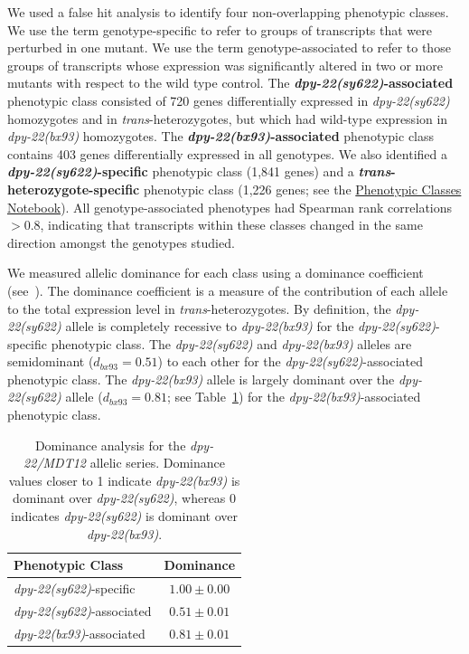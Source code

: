 \documentclass[8pt, twocolumn]{article}
\newcommand{\gene}[1]{\mbox{\emph{#1}}}
\newcommand{\dpy}[1]{\gene{dpy-22#1}}
\newcommand{\bx}{\dpy{(bx93)}}
\newcommand{\sy}{\dpy{(sy622)}}
\begin{document}
We used a false hit analysis to identify four non-overlapping phenotypic
classes. We use the term genotype-specific to refer to groups of transcripts
that were perturbed in one mutant. We use the term genotype-associated to refer
to those groups of transcripts whose expression was significantly altered in two
or more mutants with respect to the wild type control. The
\textbf{\sy{}-associated} phenotypic class consisted of 720 genes differentially
expressed in \sy{} homozygotes and in \emph{trans}-heterozygotes, but which had
wild-type expression in \bx{} homozygotes. The \textbf{\bx{}-associated}
phenotypic class contains 403 genes differentially expressed in all genotypes.
We also identified a \textbf{\sy{}-specific} phenotypic class (1,841 genes) and
a \textbf{\emph{trans}-heterozygote-specific} phenotypic class (1,226 genes; see
the
\href{https://wormlabcaltech.github.io/med-cafe/notebook/phenotypic_classes.html}{
Phenotypic Classes Notebook}). All genotype-associated phenotypes had Spearman
rank correlations $>0.8$, indicating that transcripts within these classes
changed in the same direction amongst the genotypes studied.

We measured allelic dominance for each class using a dominance coefficient
(see~). The dominance coefficient is a measure of the
contribution of each allele to the total expression level in
\emph{trans}-heterozygotes. By definition, the \sy{} allele is completely
recessive to \bx{} for the \sy{}-specific phenotypic class. The \sy{} and \bx{}
alleles are semidominant ($d_{bx93} = 0.51$) to each other for the
\sy{}-associated phenotypic class. The \bx{} allele is largely  dominant over
the \sy{} allele ($d_{bx93}=0.81$; see Table~\ref{tab:dom}) for the
\bx{}-associated phenotypic class.

\begin{table}
  \centering
  \begin{tabular}{lc}
    \toprule
    Phenotypic Class & Dominance\\
    \midrule
    \sy{}-specific & $1.00\pm0.00$\\
    \sy{}-associated & $0.51\pm0.01$\\
    \bx{}-associated & $0.81\pm0.01$\\
    \bottomrule
  \end{tabular}
  \caption{Dominance analysis for the \dpy{/MDT12} allelic series. Dominance
  values closer to 1 indicate \bx{} is dominant over \sy{}, whereas 0 indicates
  \sy{} is dominant over \bx{}.}
\label{tab:dom}

\end{table}
\end{document}
